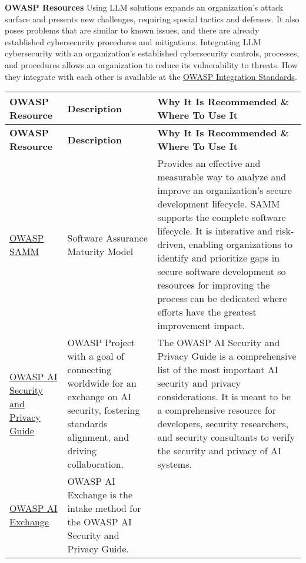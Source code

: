 \clearpage
\textbf{OWASP Resources}
Using LLM solutions expands an organization's attack surface and presents new
challenges, requiring special tactics and defenses. It also poses problems that
are similar to known issues, and there are already established cybersecurity
procedures and mitigations. Integrating LLM cybersecurity with an organization's
established cybersecurity controls, processes, and procedures allows an
organization to reduce its vulnerability to threats. How they integrate with
each other is available at the
\href{https://owasp.org/www-project-integration-standards/}{OWASP Integration Standards}.
\setlength\LTleft{0pt}
\setlength\LTright{0pt}
\begin{longtable}[c]{|p{}|p{}|p{}|}
  \hline
  \rowcolor{owasplightpurple}
  \textbf{OWASP Resource} &
  \textbf{Description} &
  \textbf{Why It Is Recommended \& Where To Use It} \\
  \hline
  \endfirsthead
  \hline
  \rowcolor{owasplightpurple}
  \textbf{OWASP Resource} &
  \textbf{Description} &
  \textbf{Why It Is Recommended \& Where To Use It} \\
  \hline
  \endhead
  \endfoot
  \href{https://owasp.org/www-project-samm/}{OWASP SAMM}&
  Software Assurance Maturity Model &
  Provides an effective and measurable way to analyze and improve an
  organization's secure development lifecycle. SAMM supports the complete
  software lifecycle. It is interative and risk-driven, enabling organizations
  to identify and prioritize gaps in secure software development so resources
  for improving the process can be dedicated where efforts have the greatest
  improvement impact. \\
  \hline
  \href{https://owasp.org/www-project-ai-security-and-privacy-guide/}{OWASP AI Security and Privacy Guide} &
  OWASP Project with a goal of connecting worldwide for an exchange on AI
  security, fostering standards alignment, and driving collaboration. &
  The OWASP AI Security and Privacy Guide is a comprehensive list of the most
  important AI security and privacy considerations. It is meant to be a
  comprehensive resource for developers, security researchers, and security
  consultants to verify the security and privacy of AI systems. \\
  \hline
  \href{https://owasp.org/www-project-ai-security/}{OWASP AI Exchange} &
  OWASP AI Exchange is the intake method for the OWASP AI Security and Privacy Guide. &

\end{longtable}
